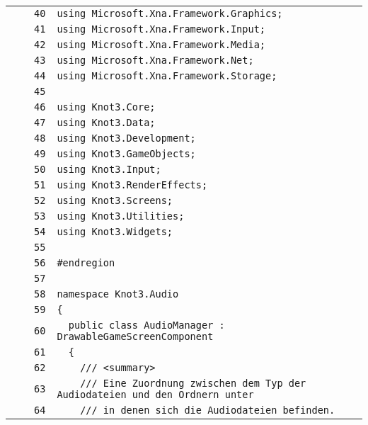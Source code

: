 \documentclass[a4paper,10pt]{article}
\begin{document}
\begin{longtable}[l]{lrrl}
\cellcolor{gray} &  & \verb~40~ & \verb~using Microsoft.Xna.Framework.Graphics;~\\
\cellcolor{gray} &  & \verb~41~ & \verb~using Microsoft.Xna.Framework.Input;~\\
\cellcolor{gray} &  & \verb~42~ & \verb~using Microsoft.Xna.Framework.Media;~\\
\cellcolor{gray} &  & \verb~43~ & \verb~using Microsoft.Xna.Framework.Net;~\\
\cellcolor{gray} &  & \verb~44~ & \verb~using Microsoft.Xna.Framework.Storage;~\\
\cellcolor{gray} &  & \verb~45~ & \verb~~\\
\cellcolor{gray} &  & \verb~46~ & \verb~using Knot3.Core;~\\
\cellcolor{gray} &  & \verb~47~ & \verb~using Knot3.Data;~\\
\cellcolor{gray} &  & \verb~48~ & \verb~using Knot3.Development;~\\
\cellcolor{gray} &  & \verb~49~ & \verb~using Knot3.GameObjects;~\\
\cellcolor{gray} &  & \verb~50~ & \verb~using Knot3.Input;~\\
\cellcolor{gray} &  & \verb~51~ & \verb~using Knot3.RenderEffects;~\\
\cellcolor{gray} &  & \verb~52~ & \verb~using Knot3.Screens;~\\
\cellcolor{gray} &  & \verb~53~ & \verb~using Knot3.Utilities;~\\
\cellcolor{gray} &  & \verb~54~ & \verb~using Knot3.Widgets;~\\
\cellcolor{gray} &  & \verb~55~ & \verb~~\\
\cellcolor{gray} &  & \verb~56~ & \verb~#endregion~\\
\cellcolor{gray} &  & \verb~57~ & \verb~~\\
\cellcolor{gray} &  & \verb~58~ & \verb~namespace Knot3.Audio~\\
\cellcolor{gray} &  & \verb~59~ & \verb~{~\\
\cellcolor{gray} &  & \verb~60~ & \verb~  public class AudioManager : DrawableGameScreenComponent~\\
\cellcolor{gray} &  & \verb~61~ & \verb~  {~\\
\cellcolor{gray} &  & \verb~62~ & \verb~    /// <summary>~\\
\cellcolor{gray} &  & \verb~63~ & \verb~    /// Eine Zuordnung zwischen dem Typ der Audiodateien und den Ordnern unter~\\
\cellcolor{gray} &  & \verb~64~ & \verb~    /// in denen sich die Audiodateien befinden.~\\

\end{longtable}
\end{document}
